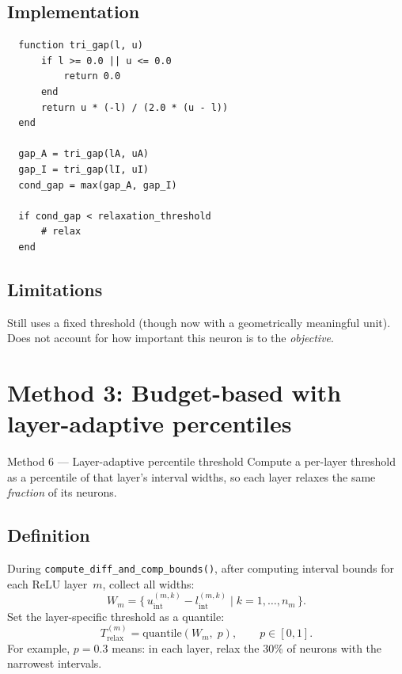\documentclass[11pt,a4paper]{article}
\newcommand{\Trelax}{T_{\mathrm{relax}}}
\begin{document}
\subsection{Implementation}
\begin{verbatim}
  function tri_gap(l, u)
      if l >= 0.0 || u <= 0.0
          return 0.0
      end
      return u * (-l) / (2.0 * (u - l))
  end

  gap_A = tri_gap(lA, uA)
  gap_I = tri_gap(lI, uI)
  cond_gap = max(gap_A, gap_I)

  if cond_gap < relaxation_threshold
      # relax
  end
\end{verbatim}

\subsection{Limitations}
Still uses a fixed threshold (though now with a geometrically meaningful unit).
Does not account for how important this neuron is to the \emph{objective}.


\section{Method 3: Budget-based with layer-adaptive percentiles}%
\label{sec:method3}

\begin{idea}{Method 6 --- Layer-adaptive percentile threshold}
Compute a per-layer threshold as a percentile of that layer's interval widths,
so each layer relaxes the same \emph{fraction} of its neurons.
\end{idea}

\subsection{Definition}

During \texttt{compute\_diff\_and\_comp\_bounds()}, after computing interval
bounds for each ReLU layer~$m$, collect all widths:
\[
  W_m = \bigl\{\, u_{\mathrm{int}}^{(m,k)} - l_{\mathrm{int}}^{(m,k)}
         \;\big|\; k = 1,\dots,n_m \,\bigr\}.
\]
Set the layer-specific threshold as a quantile:
\begin{equation}
  \Trelax^{(m)} = \mathrm{quantile}(W_m,\; p), \qquad p \in [0,1].
\end{equation}
For example, $p = 0.3$ means: in each layer, relax the 30\% of neurons with
the narrowest intervals.
\end{document}
